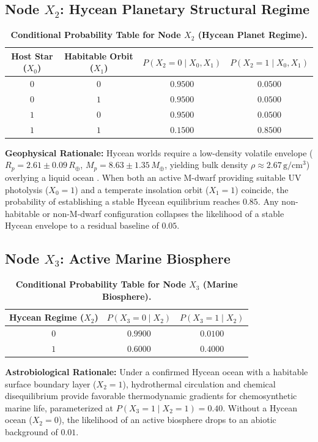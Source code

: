 \subsection{Node $X_2$: Hycean Planetary Structural Regime}
\begin{table}[htbp]
\centering
\caption{\textbf{Conditional Probability Table for Node $X_2$ (Hycean Planet Regime).}}
\label{tab:cpt_x2}
\small
\begin{tabular}{cccc}
\toprule
\textbf{Host Star ($X_0$)} & \textbf{Habitable Orbit ($X_1$)} & $P(X_2 = 0 \mid X_0, X_1)$ & $P(X_2 = 1 \mid X_0, X_1)$ \\
\midrule
$0$ & $0$ & $0.9500$ & $0.0500$ \\
$0$ & $1$ & $0.9500$ & $0.0500$ \\
$1$ & $0$ & $0.9500$ & $0.0500$ \\
$1$ & $1$ & $0.1500$ & $0.8500$ \\
\bottomrule
\end{tabular}
\end{table}
\textbf{Geophysical Rationale:} Hycean worlds require a low-density volatile envelope ($R_p = 2.61 \pm 0.09\,R_\oplus$, $M_p = 8.63 \pm 1.35\,M_\oplus$, yielding bulk density $\rho \approx 2.67\,\mathrm{g/cm^3}$) overlying a liquid ocean \cite{madhusudhan2023}. When both an active M-dwarf providing suitable UV photolysis ($X_0=1$) and a temperate insolation orbit ($X_1=1$) coincide, the probability of establishing a stable Hycean equilibrium reaches $0.85$. Any non-habitable or non-M-dwarf configuration collapses the likelihood of a stable Hycean envelope to a residual baseline of $0.05$.

\subsection{Node $X_3$: Active Marine Biosphere}
\begin{table}[htbp]
\centering
\caption{\textbf{Conditional Probability Table for Node $X_3$ (Marine Biosphere).}}
\label{tab:cpt_x3}
\small
\begin{tabular}{ccc}
\toprule
\textbf{Hycean Regime ($X_2$)} & $P(X_3 = 0 \mid X_2)$ & $P(X_3 = 1 \mid X_2)$ \\
\midrule
$0$ & $0.9900$ & $0.0100$ \\
$1$ & $0.6000$ & $0.4000$ \\
\bottomrule
\end{tabular}
\end{table}
\textbf{Astrobiological Rationale:} Under a confirmed Hycean ocean with a habitable surface boundary layer ($X_2=1$), hydrothermal circulation and chemical disequilibrium provide favorable thermodynamic gradients for chemosynthetic marine life, parameterized at $P(X_3=1 \mid X_2=1) = 0.40$. Without a Hycean ocean ($X_2=0$), the likelihood of an active biosphere drops to an abiotic background of $0.01$.

